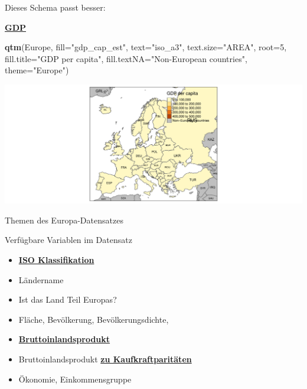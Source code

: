 \documentclass[ignorenonframetext,]{beamer}
\newenvironment{Shaded}{\begin{snugshade}}{\end{snugshade}}
\newcommand{\KeywordTok}[1]{\textcolor[rgb]{0.13,0.29,0.53}{\textbf{#1}}}
\newcommand{\DataTypeTok}[1]{\textcolor[rgb]{0.13,0.29,0.53}{#1}}
\newcommand{\DecValTok}[1]{\textcolor[rgb]{0.00,0.00,0.81}{#1}}
\newcommand{\StringTok}[1]{\textcolor[rgb]{0.31,0.60,0.02}{#1}}
\newcommand{\NormalTok}[1]{#1}
\providecommand{\tightlist}{%
  \setlength{\itemsep}{0pt}\setlength{\parskip}{0pt}}
\begin{document}
\begin{frame}[fragile]{Dieses Schema passt besser:}

\begin{block}{\href{https://en.wikipedia.org/wiki/Population_density}{\textbf{GDP}}}

\begin{Shaded}
\begin{Highlighting}[]
\KeywordTok{qtm}\NormalTok{(Europe, }\DataTypeTok{fill=}\StringTok{"gdp_cap_est"}\NormalTok{, }\DataTypeTok{text=}\StringTok{"iso_a3"}\NormalTok{, }
    \DataTypeTok{text.size=}\StringTok{"AREA"}\NormalTok{, }\DataTypeTok{root=}\DecValTok{5}\NormalTok{, }\DataTypeTok{fill.title=}\StringTok{"GDP per capita"}\NormalTok{, }
    \DataTypeTok{fill.textNA=}\StringTok{"Non-European countries"}\NormalTok{, }\DataTypeTok{theme=}\StringTok{"Europe"}\NormalTok{)}
\end{Highlighting}
\end{Shaded}

\includegraphics{tmap_files/figure-beamer/unnamed-chunk-11-1.pdf}

\end{block}

\end{frame}

\begin{frame}{Themen des Europa-Datensatzes}

\begin{block}{Verfügbare Variablen im Datensatz}

\begin{itemize}
\tightlist
\item
  \href{http://userpage.chemie.fu-berlin.de/diverse/doc/ISO_3166.html}{\textbf{ISO
  Klassifikation}}
\item
  Ländername
\item
  Ist das Land Teil Europas?
\item
  Fläche, Bevölkerung, Bevölkerungsdichte,
\item
  \href{https://en.wikipedia.org/wiki/Gross_domestic_product}{\textbf{Bruttoinlandsprodukt}}
\item
  Bruttoinlandsprodukt
  \href{https://en.wikipedia.org/wiki/List_of_countries_by_GDP_\%28PPP\%29_per_capita}{\textbf{zu
  Kaufkraftparitäten}}
\item
  Ökonomie, Einkommensgruppe
\end{itemize}

\end{block}

\end{frame}
\end{document}
